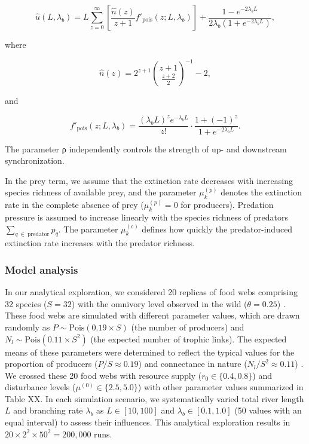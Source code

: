 \documentclass[11pt, class=article, crop=false]{standalone}
\begin{document}
\begin{equation}
    \hat{u}(L, \lambda_b) = L \sum_{z = 0}^{\infty} \left[ \frac{\hat{n}(z)}{z + 1} f'_{\text{pois}}(z; L, \lambda_b)\right] + \frac{1 - e^{-2 \lambda_b L}}{2 \lambda_b (1 + e^{-2 \lambda_b L})},
\end{equation}

where

\begin{equation}
    \hat{n}(z) = 2^{z + 1} \binom{z + 1}{\frac{z + 2}{2}}^{-1} - 2,
\end{equation}

and

\begin{equation}
    f'_{\text{pois}}(z; L, \lambda_b) = \frac{(\lambda_b L)^z e^{-\lambda_b L}}{z!} \cdot \frac{1 + (-1)^{z}}{1 + e^{-2\lambda_b L}}.
\end{equation}

The parameter ρ independently controls the strength of up- and downstream synchronization.

In the prey term, we assume that the extinction rate decreases with increasing species richness of available prey, and the parameter $\mu_{k}^{(p)}$ denotes the extinction rate in the complete absence of prey ($\mu_{k}^{(p)} = 0$ for producers).
Predation pressure is assumed to increase linearly with the species richness of predators $\sum_{q~\in~\text{predator}} p_{q}$.
The parameter $\mu_{k}^{(c)}$ defines how quickly the predator-induced extinction rate increases with the predator richness.

\subsubsection{Model analysis}

In our analytical exploration, we considered 20 replicas of food webs comprising 32 species ($S = 32$) with the omnivory level observed in the wild ($\theta = 0.25$) \cite{johnson_trophic_2014}.
These food webs are simulated with different parameter values, which are drawn randomly as $P \sim \mbox{Pois}(0.19 \times S)$ (the number of producers) and $N_l \sim \mbox{Pois}(0.11 \times S^2)$ (the expected number of trophic links).
The expected means of these parameters were determined to reflect the typical values for the proportion of producers ($P / S \approx 0.19$) \citep{briand_community_1984} and connectance in nature ($N_l / S^2 \approx 0.11$) \citep{dunne_food-web_2002}.
We crossed these 20 food webs with resource supply ($r_0 \in \{0.4, 0.8\}$) and disturbance levels ($\mu^{(0)} \in \{2.5, 5.0\}$) with other parameter values summarized in Table XX.
In each simulation scenario, we systematically varied total river length $L$ and branching rate $\lambda_b$ as $L \in [10, 100]$ and $\lambda_b \in [0.1, 1.0]$ (50 values with an equal interval) to assess their influences.
This analytical exploration results in $20 \times 2^2 \times 50^2 = 200,000$ runs.
\end{document}
